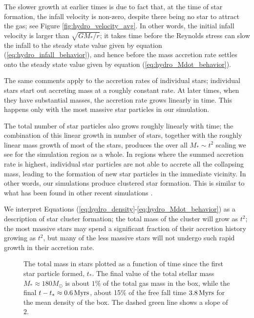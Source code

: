 \documentclass[../dissertation.tex]{subfiles}
\begin{document}
The slower growth at earlier times is due to fact that, at the time 
of star formation, the infall velocity is non-zero, despite there being no star to 
attract the gas; see Figure \ref{fig:hydro_velocity_avg}. In other words, the initial 
infall velocity is larger than $\sqrt{GM_*/r}$; it takes time before the Reynolds stress can slow the infall to the steady state value given by equation 
(\ref{eq:hydro_infall_behavior}), and hence before the mass accretion rate settles onto the steady 
state value given by equation (\ref{eq:hydro_Mdot_behavior}).

The same comments apply to the accretion rates of individual stars; individual stars start
out accreting mass at a roughly constant rate. At later times, when they have substantial
masses, the accretion rate grows linearly in time. This happens only with the most massive 
star particles in our simulation. 

The total number of star particles also grows roughly
  linearly with time; the combination of this linear growth in number
  of stars, together with the roughly linear mass growth of most of
  the stars, produces the over all $M_*\sim t^2$ scaling we see for
  the simulation region as a whole. In regions where the summed
  accretion rate is highest, individual star particles are not able to
  accrete all the collapsing mass, leading to the formation of new
  star particles in the immediate vicinity. In other words, our
  simulations produce clustered star formation. This is similar to
  what has been found in other recent simulations
  \citep{2015ApJ...800...49L,2015ApJ...806...31G}.

We interpret Equations (\ref{eq:hydro_density}-\ref{eq:hydro_Mdot_behavior}) as a description of star cluster formation; the total mass of the cluster will grow as $t^2$; the most massive stars may spend a significant fraction of their accretion history growing as $t^2$, but many of the less massive stars will not undergo such rapid growth in their accretion rate.  
%
\begin{figure}[htb]%
\caption[Hydro Mass Accretion rate over time]{The total mass in stars plotted as a function of time since the first star 
particle formed, $t_*$. The final value of the total stellar mass $M_*\approx180M_\odot$ 
is about $1\%$ of the total gas mass in the box, while the final $t-t_*\approx 0.6\,\rm Myrs$, 
about 15\% of the free fall time $3.8\,\rm Myrs$ for the mean density of the box. The dashed green line
shows a slope of $2$. \label{fig:hydro_M_t2}}
\end{figure}
\end{document}
